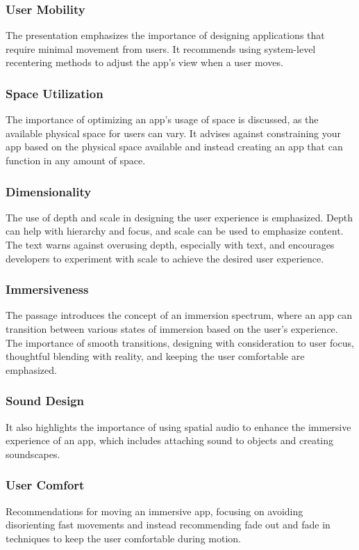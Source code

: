 \subsubsection{User Mobility} 
The presentation emphasizes the importance of designing applications that require minimal movement from users. It recommends using system-level recentering methods to adjust the app's view when a user moves.
\subsubsection{Space Utilization} 
The importance of optimizing an app's usage of space is discussed, as the available physical space for users can vary. It advises against constraining your app based on the physical space available and instead creating an app that can function in any amount of space.
\subsubsection{Dimensionality} 
The use of depth and scale in designing the user experience is emphasized. Depth can help with hierarchy and focus, and scale can be used to emphasize content. The text warns against overusing depth, especially with text, and encourages developers to experiment with scale to achieve the desired user experience.
\subsubsection{Immersiveness}
The passage introduces the concept of an immersion spectrum, where an app can transition between various states of immersion based on the user's experience. The importance of smooth transitions, designing with consideration to user focus, thoughtful blending with reality, and keeping the user comfortable are emphasized.
\subsubsection{Sound Design}
It also highlights the importance of using spatial audio to enhance the immersive experience of an app, which includes attaching sound to objects and creating soundscapes.
\subsubsection{User Comfort}
Recommendations for moving an immersive app, focusing on avoiding disorienting fast movements and instead recommending fade out and fade in techniques to keep the user comfortable during motion.
